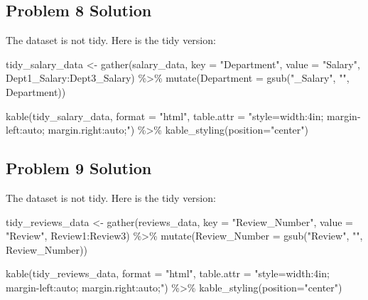 \documentclass[
  letterpaper,
  DIV=11,
  numbers=noendperiod]{scrreprt}
\newenvironment{Shaded}{\begin{snugshade}}{\end{snugshade}}
\newcommand{\AttributeTok}[1]{\textcolor[rgb]{0.40,0.45,0.13}{#1}}
\newcommand{\FunctionTok}[1]{\textcolor[rgb]{0.28,0.35,0.67}{#1}}
\newcommand{\NormalTok}[1]{\textcolor[rgb]{0.00,0.23,0.31}{#1}}
\newcommand{\OtherTok}[1]{\textcolor[rgb]{0.00,0.23,0.31}{#1}}
\newcommand{\SpecialCharTok}[1]{\textcolor[rgb]{0.37,0.37,0.37}{#1}}
\newcommand{\StringTok}[1]{\textcolor[rgb]{0.13,0.47,0.30}{#1}}
\begin{document}
\subsection*{Problem 8 Solution}\label{problem-8-solution}

The dataset is not tidy. Here is the tidy version:

\begin{Shaded}
\begin{Highlighting}[]
\NormalTok{tidy\_salary\_data }\OtherTok{\textless{}{-}} \FunctionTok{gather}\NormalTok{(salary\_data, }\AttributeTok{key =} \StringTok{"Department"}\NormalTok{, }\AttributeTok{value =} \StringTok{"Salary"}\NormalTok{, Dept1\_Salary}\SpecialCharTok{:}\NormalTok{Dept3\_Salary) }\SpecialCharTok{\%\textgreater{}\%}
  \FunctionTok{mutate}\NormalTok{(}\AttributeTok{Department =} \FunctionTok{gsub}\NormalTok{(}\StringTok{"\_Salary"}\NormalTok{, }\StringTok{""}\NormalTok{, Department))}

\FunctionTok{kable}\NormalTok{(tidy\_salary\_data, }\AttributeTok{format =} \StringTok{"html"}\NormalTok{, }\AttributeTok{table.attr =} \StringTok{"style=\textquotesingle{}width:4in; margin{-}left:auto; margin.right:auto;\textquotesingle{}"}\NormalTok{)  }\SpecialCharTok{\%\textgreater{}\%}
  \FunctionTok{kable\_styling}\NormalTok{(}\AttributeTok{position=}\StringTok{"center"}\NormalTok{)}
\end{Highlighting}
\end{Shaded}

\subsection*{Problem 9 Solution}\label{problem-9-solution}

The dataset is not tidy. Here is the tidy version:

\begin{Shaded}
\begin{Highlighting}[]
\NormalTok{tidy\_reviews\_data }\OtherTok{\textless{}{-}} \FunctionTok{gather}\NormalTok{(reviews\_data, }\AttributeTok{key =} \StringTok{"Review\_Number"}\NormalTok{, }\AttributeTok{value =} \StringTok{"Review"}\NormalTok{, Review1}\SpecialCharTok{:}\NormalTok{Review3) }\SpecialCharTok{\%\textgreater{}\%}
  \FunctionTok{mutate}\NormalTok{(}\AttributeTok{Review\_Number =} \FunctionTok{gsub}\NormalTok{(}\StringTok{"Review"}\NormalTok{, }\StringTok{""}\NormalTok{, Review\_Number))}

\FunctionTok{kable}\NormalTok{(tidy\_reviews\_data, }\AttributeTok{format =} \StringTok{"html"}\NormalTok{, }\AttributeTok{table.attr =} \StringTok{"style=\textquotesingle{}width:4in; margin{-}left:auto; margin.right:auto;\textquotesingle{}"}\NormalTok{)  }\SpecialCharTok{\%\textgreater{}\%}
  \FunctionTok{kable\_styling}\NormalTok{(}\AttributeTok{position=}\StringTok{"center"}\NormalTok{)}
\end{Highlighting}
\end{Shaded}
\end{document}
